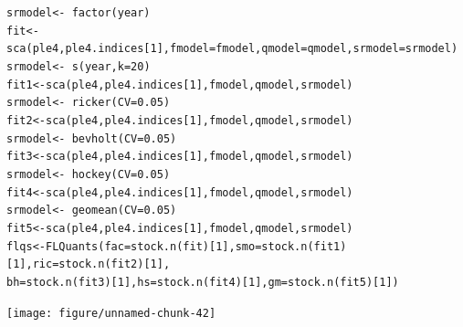 \documentclass[a4paper,english,10pt]{article}\usepackage[]{graphicx}\usepackage[]{color}
\makeatletter
\newcommand{\hlnum}[1]{\textcolor[rgb]{0.2,0.2,0.2}{#1}}%
\newcommand{\hlopt}[1]{\textcolor[rgb]{0.2,0.2,0.2}{#1}}%
\newcommand{\hlstd}[1]{\textcolor[rgb]{0,0,0}{#1}}%
\newcommand{\hlkwb}[1]{\textcolor[rgb]{0.361,0.506,0.596}{#1}}%
\newcommand{\hlkwc}[1]{\textcolor[rgb]{0.361,0.506,0.596}{#1}}%
\newcommand{\hlkwd}[1]{\textcolor[rgb]{0.361,0.506,0.596}{#1}}%
\newenvironment{kframe}{%
 \def\at@end@of@kframe{}%
 \ifinner\ifhmode%
  \def\at@end@of@kframe{\end{minipage}}%
  \begin{minipage}{\columnwidth}%
 \fi\fi%
 \def\FrameCommand##1{\hskip\@totalleftmargin \hskip-\fboxsep
 \colorbox{shadecolor}{##1}\hskip-\fboxsep
     \hskip-\linewidth \hskip-\@totalleftmargin \hskip\columnwidth}%
 \MakeFramed {\advance\hsize-\width
   \@totalleftmargin\z@ \linewidth\hsize
   \@setminipage}}%
 {\par\unskip\endMakeFramed%
 \at@end@of@kframe}
\newenvironment{knitrout}{}{} %
\makeatother
\begin{document}
\begin{knitrout}
\color{fgcolor}\begin{kframe}
\begin{alltt}
\hlstd{srmodel} \hlkwb{<-} \hlopt{~}\hlkwd{factor}\hlstd{(year)}
\hlstd{fit} \hlkwb{<-} \hlkwd{sca}\hlstd{(ple4, ple4.indices[}\hlnum{1}\hlstd{],} \hlkwc{fmodel} \hlstd{= fmodel,} \hlkwc{qmodel} \hlstd{= qmodel,} \hlkwc{srmodel} \hlstd{= srmodel)}
\hlstd{srmodel} \hlkwb{<-} \hlopt{~}\hlkwd{s}\hlstd{(year,} \hlkwc{k} \hlstd{=} \hlnum{20}\hlstd{)}
\hlstd{fit1} \hlkwb{<-} \hlkwd{sca}\hlstd{(ple4, ple4.indices[}\hlnum{1}\hlstd{], fmodel, qmodel, srmodel)}
\hlstd{srmodel} \hlkwb{<-} \hlopt{~}\hlkwd{ricker}\hlstd{(}\hlkwc{CV} \hlstd{=} \hlnum{0.05}\hlstd{)}
\hlstd{fit2} \hlkwb{<-} \hlkwd{sca}\hlstd{(ple4, ple4.indices[}\hlnum{1}\hlstd{], fmodel, qmodel, srmodel)}
\hlstd{srmodel} \hlkwb{<-} \hlopt{~}\hlkwd{bevholt}\hlstd{(}\hlkwc{CV} \hlstd{=} \hlnum{0.05}\hlstd{)}
\hlstd{fit3} \hlkwb{<-} \hlkwd{sca}\hlstd{(ple4, ple4.indices[}\hlnum{1}\hlstd{], fmodel, qmodel, srmodel)}
\hlstd{srmodel} \hlkwb{<-} \hlopt{~}\hlkwd{hockey}\hlstd{(}\hlkwc{CV} \hlstd{=} \hlnum{0.05}\hlstd{)}
\hlstd{fit4} \hlkwb{<-} \hlkwd{sca}\hlstd{(ple4, ple4.indices[}\hlnum{1}\hlstd{], fmodel, qmodel, srmodel)}
\hlstd{srmodel} \hlkwb{<-} \hlopt{~}\hlkwd{geomean}\hlstd{(}\hlkwc{CV} \hlstd{=} \hlnum{0.05}\hlstd{)}
\hlstd{fit5} \hlkwb{<-} \hlkwd{sca}\hlstd{(ple4, ple4.indices[}\hlnum{1}\hlstd{], fmodel, qmodel, srmodel)}
\hlstd{flqs} \hlkwb{<-} \hlkwd{FLQuants}\hlstd{(}\hlkwc{fac} \hlstd{=} \hlkwd{stock.n}\hlstd{(fit)[}\hlnum{1}\hlstd{],} \hlkwc{smo} \hlstd{=} \hlkwd{stock.n}\hlstd{(fit1)[}\hlnum{1}\hlstd{],} \hlkwc{ric} \hlstd{=} \hlkwd{stock.n}\hlstd{(fit2)[}\hlnum{1}\hlstd{],}
    \hlkwc{bh} \hlstd{=} \hlkwd{stock.n}\hlstd{(fit3)[}\hlnum{1}\hlstd{],} \hlkwc{hs} \hlstd{=} \hlkwd{stock.n}\hlstd{(fit4)[}\hlnum{1}\hlstd{],} \hlkwc{gm} \hlstd{=} \hlkwd{stock.n}\hlstd{(fit5)[}\hlnum{1}\hlstd{])}
\end{alltt}
\end{kframe}
\end{knitrout}


\begin{knitrout}
\color{fgcolor}

{\centering \texttt{[image: figure/unnamed-chunk-42]} 

}



\end{knitrout}
\end{document}
